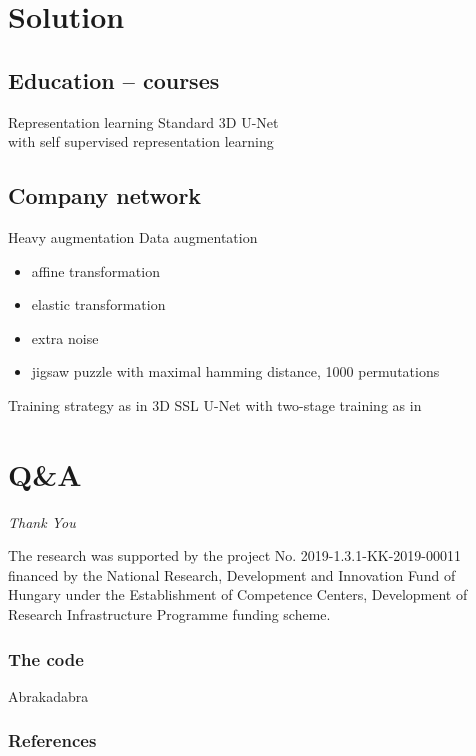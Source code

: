 \documentclass[aspectratio=169]{beamer}
\begin{document}
\section{Solution}
\subsection{Education -- courses}
\begin{frame}{Representation learning}
    \centering Standard 3D U-Net \cite{cciccek20163d}\\ with self supervised representation learning
\end{frame}

\subsection{Company network}
\begin{frame}{Heavy augmentation}
    Data augmentation
    \begin{itemize}
        \item affine transformation 
        \item elastic transformation
        \item extra noise
        \item jigsaw puzzle with maximal hamming distance, 1000 permutations
    \end{itemize}
    Training strategy as in 3D SSL U-Net with two-stage training as in \cite{adam2023}
\end{frame}


\section{Q\&A}
\begin{frame}
    \begin{center}
        \Huge \emph{Thank You}
    \end{center}

    \tiny The research was supported by the project No. 2019-1.3.1-KK-2019-00011 financed by the National Research, Development and Innovation Fund of Hungary under the Establishment of Competence Centers, Development of Research Infrastructure Programme funding scheme. 
\end{frame}

\backupbegin
\begin{frame}[c]
    \frametitle{The code}
    \centering
    Abrakadabra
\end{frame}

\begin{frame}%
    \frametitle{References}
    
    {
    \tiny
    
    }
\end{frame}
\backupend
\end{document}
